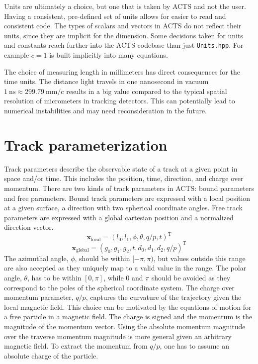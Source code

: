 Units are ultimately a choice, but one that is taken by ACTS and not the user. Having a consistent, pre-defined set of units allows for easier to read and consistent code. The types of scalars and vectors in ACTS do not reflect their units, since they are implicit for the dimension. Some decisions taken for units and constants reach further into the ACTS codebase than just \texttt{Units.hpp}. For example $c = 1$ is built implicitly into many equations.

The choice of measuring length in millimeters has direct consequences for the time units. The distance light travels in one nanosecond in vacuum $1\ \text{ns} \approx 299.79\ \text{mm/c}$ results in a big value compared to the typical spatial resolution of micrometers in tracking detectors. This can potentially lead to numerical instabilities and may need reconsideration in the future.

\section{Track parameterization}
\label{sec:intro/acts/track-parameterization}

Track parameters describe the observable state of a track at a given point in space and/or time. This includes the position, time, direction, and charge over momentum. There are two kinds of track parameters in ACTS: bound parameters and free parameters. Bound track parameters are expressed with a local position at a given surface, a direction with two spherical coordinate angles. Free track parameters are expressed with a global cartesian position and a normalized direction vector.
\begin{equation}
    \mathbf{x}_\text{local} = \left(l_0, l_1, \phi, \theta, q/p, t\right)^\mathrm{T}
\end{equation}
\begin{equation}
    \mathbf{x}_\text{global} = \left(g_0, g_1, g_2, t, d_0, d_1, d_2, q/p\right)^\mathrm{T}
\end{equation}
The azimuthal angle, $\phi$, should be within $[-\pi, \pi)$, but values outside this range are also accepted as they uniquely map to a valid value in the range. The polar angle, $\theta$, has to be within $[0, \pi]$, while $0$ and $\pi$ should be avoided as they correspond to the poles of the spherical coordinate system. The charge over momentum parameter, $q/p$, captures the curvature of the trajectory given the local magnetic field. This choice can be motivated by the equations of motion for a free particle in a magnetic field. The charge is signed and the momentum is the magnitude of the momentum vector. Using the absolute momentum magnitude over the traverse momentum magnitude is more general given an arbitrary magnetic field. To extract the momentum from $q/p$, one has to assume an absolute charge of the particle.

